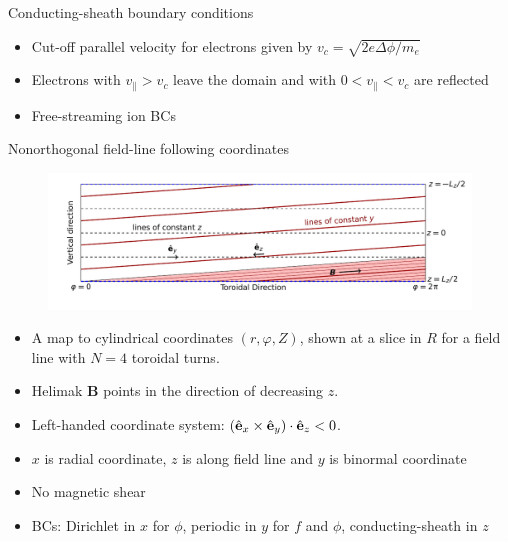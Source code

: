 \documentclass[12pt,table]{beamer}
\newcommand{\vpar}{{v_\parallel}}
\begin{document}
\begin{frame}{Conducting-sheath boundary conditions}
\begin{minipage}{.62\textwidth}
\begin{figure}
    \end{figure}
    \end{minipage}%
    \begin{minipage}{.35\textwidth} \scriptsize
        \begin{itemize}
            \item Cut-off parallel velocity for electrons given by
            $v_c = \sqrt{2e\Delta \phi/m_e}$
            \item Electrons with $\vpar > v_c$ leave the domain and with $0 < \vpar < v_c$ are reflected
            \item Free-streaming ion BCs
        \end{itemize}
    \end{minipage}%
\end{frame}

\begin{frame}{Nonorthogonal field-line following coordinates}
\vspace{.5cm}
\begin{figure}
    \centering
    \includegraphics[trim= 0cm .5cm 0cm 1cm,width=\linewidth]{figs/helimak-B-field.pdf}
    \label{fig:cyl-map}
\end{figure}
\vspace{-.5cm}
\begin{itemize}
\footnotesize
    \item A map to cylindrical coordinates $(r,\varphi,Z)$, shown at a slice in $R$ for a field line with $N=4$ toroidal turns.
    \item Helimak $\bm{B}$ points in the direction of decreasing $z$.
    \item Left-handed coordinate system: $(\hat{\bf{e}}_x \times \hat{\bf{e}}_y) \cdot \hat{\bf{e}}_z < 0$.
    \item $x$ is radial coordinate, $z$ is along field line and $y$ is binormal coordinate
    \item No magnetic shear
    \item BCs: Dirichlet in $x$ for $\phi$, periodic in $y$ for $f$ and $\phi$, conducting-sheath in $z$
\end{itemize}
\end{frame}
\end{document}
